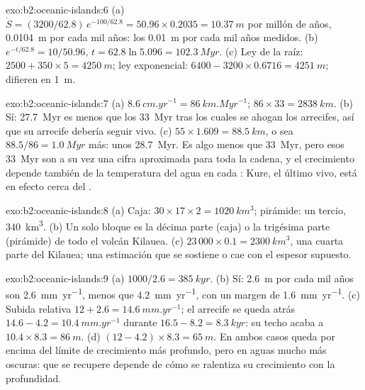 \begin{solution}{exo:b2:oceanic-islands:6}
(a) $\dot S = (3200/62.8)\,e^{-100/62.8} = 50.96\times0.2035 = \qty{10.37}{m}$ por millón de años,
\qty{0.0104}{m} por cada mil años: los \qty{0.01}{m} por cada mil años medidos. (b) $e^{-t/62.8}
= 10/50.96$, $t = 62.8\ln5.096 = \qty{102.3}{Myr}$. (c) Ley de la raíz: $2500 + 350\times5 =
\qty{4250}{m}$; ley exponencial: $6400 - 3200\times0.6716 = \qty{4251}{m}$; difieren en
\qty{1}{m}.
\end{solution}

\begin{solution}{exo:b2:oceanic-islands:7}
(a) $\qty{8.6}{cm.yr^{-1}} = \qty{86}{km.Myr^{-1}}$; $86\times33 = \qty{2838}{km}$. (b) Sí:
\qty{27.7}{Myr} es menos que los \qty{33}{Myr} tras los cuales se ahogan los arrecifes, así que su arrecife debería
seguir vivo. (c) $55\times1.609 = \qty{88.5}{km}$, o sea $88.5/86 = \qty{1.0}{Myr}$ más: unos
\qty{28.7}{Myr}. Es algo menos que \qty{33}{Myr}, pero esos \qty{33}{Myr} son a su vez una cifra
aproximada para toda la cadena, y el crecimiento depende también de la temperatura del agua en cada
: Kure, el último  vivo, está en efecto cerca del .
\end{solution}

\begin{solution}{exo:b2:oceanic-islands:8}
(a) Caja: $30\times17\times2 = \qty{1020}{km^3}$; pirámide: un tercio, \qty{340}{km^3}. (b) Un solo bloque
es la décima parte (caja) o la trigésima parte (pirámide) de todo el volcán Kilauea. (c) $23\,000\times
0.1 = \qty{2300}{km^3}$, una cuarta parte del Kilauea; una estimación que se sostiene o cae con el espesor
supuesto.
\end{solution}

\begin{solution}{exo:b2:oceanic-islands:9}
(a) $1000/2.6 = \qty{385}{kyr}$. (b) Sí: \qty{2.6}{m} por cada mil años son
\qty{2.6}{mm.yr^{-1}}, menos que \qty{4.2}{mm.yr^{-1}}, con un margen de \qty{1.6}{mm.yr^{-1}}.
(c) Subida relativa $12 + 2.6 = \qty{14.6}{mm.yr^{-1}}$; el arrecife se queda atrás $14.6 - 4.2 =
\qty{10.4}{mm.yr^{-1}}$ durante $16.5 - 8.2 = \qty{8.3}{kyr}$: su techo acaba a $10.4\times8.3 =
\qty{86}{m}$. (d) $(12 - 4.2)\times8.3 = \qty{65}{m}$. En ambos casos queda por encima del límite de crecimiento
más profundo, pero en aguas mucho más oscuras: que se recupere depende de cómo se ralentiza su crecimiento con la
profundidad.
\end{solution}

